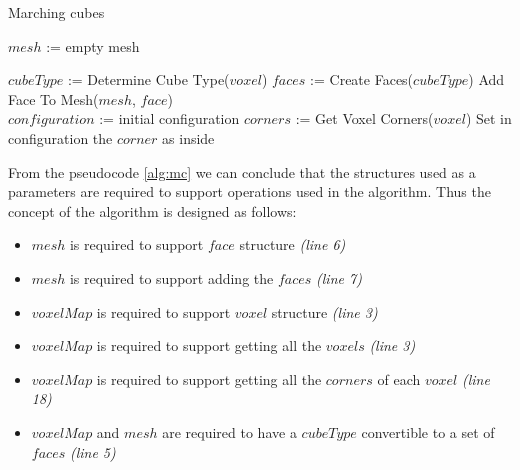 \begin{algorithm}[H]
\caption{Marching cubes}
\label{alg:mc}

\begin{algorithmic}[1]
			\State $mesh$ := empty mesh

			\State $cubeType$ := Determine Cube Type($voxel$)
			\State $faces$ := Create Faces($cubeType$)
				\State Add Face To Mesh($mesh$, $face$)
			\EndFor
		\EndParallelFor
		\State {}
	\EndFunction
	\\
		\State $configuration$ := initial configuration
		\State {}
		\State {}
		\State {}
		\State $corners$ := Get Voxel Corners($voxel$)
				\State Set in configuration the $corner$ as inside
			\EndIf
		\EndFor
		\State {}
	\EndFunction
\end{algorithmic}
\end{algorithm}



From the pseudocode \ref{alg:mc} we can conclude that the structures used as a parameters
are required to support operations used in the algorithm. Thus the concept of the algorithm
is designed as follows:

\begin{itemize}
\item $mesh$ is required to support $face$ structure \emph{(line 6)}
\item $mesh$ is required to support adding the $faces$ \emph{(line 7)}
\item $voxelMap$ is required to support $voxel$ structure \emph{(line 3)}
\item $voxelMap$ is required to support getting all the $voxels$ \emph{(line 3)}
\item $voxelMap$ is required to support getting all the $corners$ of each $voxel$ \emph{(line 18)}
\item $voxelMap$ and $mesh$ are required to have a $cubeType$ convertible to a set of $faces$ \emph{(line 5)}
\end{itemize}

